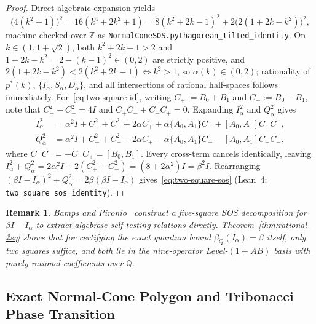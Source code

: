 \documentclass[11pt,a4paper]{article}
\newtheorem{remark}[theorem]{Remark}
\newcommand{\QQ}{\mathbb{Q}}
\newcommand{\ZZ}{\mathbb{Z}}
\begin{document}
\begin{proof}
Direct algebraic expansion yields
\begin{equation}
  \bigl(4(k^2+1)\bigr)^2 = 16(k^4 + 2k^2 + 1) = 8(k^2 + 2k - 1)^2 + 2\bigl(2(1 + 2k - k^2)\bigr)^2,
\end{equation}
machine-checked over $\ZZ$ as \texttt{NormalConeSOS.pythagorean\_tilted\_identity}.
On $k \in (1, 1+\sqrt{2})$, both $k^2+2k-1 > 2$ and $1+2k-k^2 = 2-(k-1)^2 \in (0,2)$ are strictly positive, and $2(1+2k-k^2) < 2(k^2+2k-1) \iff k^2 > 1$, so $\alpha(k) \in (0,2)$; rationality of $p^*(k)$, $\{I_\alpha, S_\alpha, D_\alpha\}$, and all intersections of rational half-spaces follows immediately.
For~\eqref{eq:two-square-id}, writing $C_+ := B_0 + B_1$ and $C_- := B_0 - B_1$, note that $C_+^2 + C_-^2 = 4I$ and $C_+ C_- + C_- C_+ = 0$. Expanding $I_\alpha^2$ and $Q_\alpha^2$ gives
\begin{align}
  I_\alpha^2 &= \alpha^2 I + C_+^2 + C_-^2 + 2\alpha C_+ + \alpha\{A_0, A_1\} C_- + [A_0, A_1] C_+ C_-,\\
  Q_\alpha^2 &= \alpha^2 I + C_+^2 + C_-^2 - 2\alpha C_+ - \alpha\{A_0, A_1\} C_- - [A_0, A_1] C_+ C_-,
\end{align}
where $C_+ C_- = -C_- C_+ = [B_0, B_1]$. Every cross-term cancels identically, leaving $I_\alpha^2 + Q_\alpha^2 = 2\alpha^2 I + 2(C_+^2 + C_-^2) = (8 + 2\alpha^2)I = \beta^2 I$. Rearranging $(\beta I - I_\alpha)^2 + Q_\alpha^2 = 2\beta(\beta I - I_\alpha)$ gives~\eqref{eq:two-square-sos} (Lean~4: \texttt{two\_square\_sos\_identity}).
\end{proof}

\begin{remark}
Bamps and Pironio~\cite{bamps2015sos} construct a five-square SOS decomposition for $\beta I - I_\alpha$ to extract algebraic self-testing relations directly. Theorem~\ref{thm:rational-2sq} shows that for certifying the exact quantum bound $\beta_Q(I_\alpha) = \beta$ itself, only \emph{two} squares suffice, and both lie in the nine-operator Level-$(1+AB)$ basis with purely rational coefficients over $\QQ$.
\end{remark}

\subsection{Exact Normal-Cone Polygon and Tribonacci Phase Transition}
\end{document}
